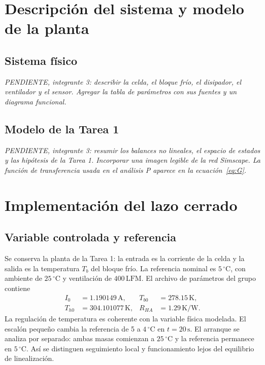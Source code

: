 \documentclass[journal,twocolumn]{IEEEtran}
\begin{document}
\section{Descripción del sistema y modelo de la planta}
\subsection{Sistema físico}
\textit{PENDIENTE, integrante 3: describir la celda, el bloque frío, el disipador, el ventilador y el sensor. Agregar la tabla de parámetros con sus fuentes y un diagrama funcional.}

\subsection{Modelo de la Tarea 1}
\textit{PENDIENTE, integrante 3: resumir los balances no lineales, el espacio de estados y las hipótesis de la Tarea 1. Incorporar una imagen legible de la red Simscape. La función de transferencia usada en el análisis P aparece en la ecuación~\eqref{eq:G}.}

\section{Implementación del lazo cerrado}\label{sec:lazo}
\subsection{Variable controlada y referencia}
Se conserva la planta de la Tarea 1: la entrada es la corriente de la celda y la salida es la temperatura $T_b$ del bloque frío. La referencia nominal es $5\,^{\circ}\mathrm C$, con ambiente de $25\,^{\circ}\mathrm C$ y ventilación de $400\,\mathrm{LFM}$. El archivo de parámetros del grupo contiene
\begin{align}
 I_0&=1.190149\,\mathrm A, & T_{b0}&=278.15\,\mathrm K,\\
 T_{h0}&=304.101077\,\mathrm K, & R_{HA}&=1.29\,\mathrm{K/W}.
\end{align}
La regulación de temperatura es coherente con la variable física modelada. El escalón pequeño cambia la referencia de 5 a $4\,^{\circ}\mathrm C$ en $t=20\,\mathrm s$. El arranque se analiza por separado: ambas masas comienzan a $25\,^{\circ}\mathrm C$ y la referencia permanece en $5\,^{\circ}\mathrm C$. Así se distinguen seguimiento local y funcionamiento lejos del equilibrio de linealización.
\end{document}
